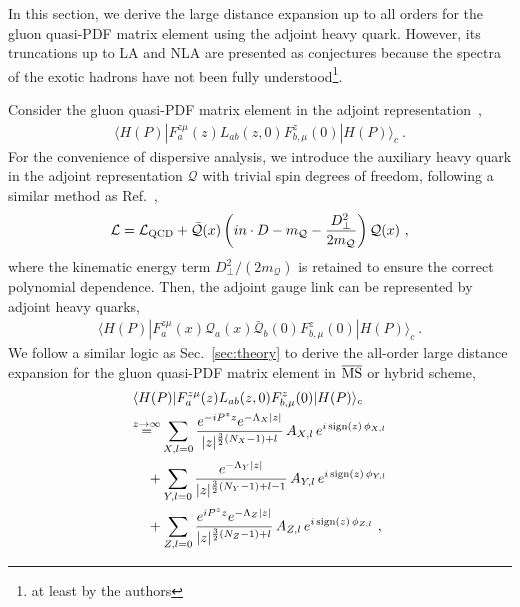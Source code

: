 \documentclass[a4paper,11pt]{article}
\begin{document}
In this section, we derive the large distance expansion up to all orders for the gluon quasi-PDF matrix element using the adjoint heavy quark. However, its truncations up to LA and NLA are presented as conjectures because the spectra of the exotic hadrons have not been fully understood\footnote{at least by the authors}.

Consider the gluon quasi-PDF matrix element in the adjoint representation~\cite{Zhang:2018diq},
\begin{align}
\langle H(P) | F^{z\mu}_{a}(z) L_{ab}(z,0) F^{z}_{b,\mu}(0) | H(P) \rangle_c \ .
\end{align}
For the convenience of dispersive analysis, we introduce the auxiliary heavy quark in the adjoint representation $\mathcal{Q}$ with trivial spin degrees of freedom, following a similar method as Ref.~\cite{Zhang:2018diq},
\begin{align}
\mathcal{L} = \mathcal{L}_{\rm QCD} + \bar{\mathcal{Q}}(x) \left(i n \cdot D - m_{\mathcal{Q}} - \frac{D_{\perp}^2}{2m_{\mathcal{Q}}}\right) \mathcal{Q}(x) \ ,
\end{align}
where the kinematic energy term $D_{\perp}^2/(2m_{\mathcal{Q}})$ is retained to ensure the correct polynomial dependence. Then, the adjoint gauge link can be represented by adjoint heavy quarks, 
\begin{align}
\langle H(P) | F^{z\mu}_{a}(x) \mathcal{Q}_{a}(x) \bar{\mathcal{Q}}_{b}(0) F^{z}_{b,\mu}(0) | H(P) \rangle_c \ .
\end{align}
We follow a similar logic as Sec.~\ref{sec:theory} to derive the all-order large distance expansion for the gluon quasi-PDF matrix element in $\overline{\rm MS}$ or hybrid scheme,
\begin{align}\label{eq:GluonqPDFLzGen}
&\langle H(P) | F^{z\mu}_{a}(z) L_{ab}(z,0) F^{z}_{b,\mu}(0) | H(P) \rangle_c   \nonumber\\
&{\overset{z\rightarrow \infty}{=}}   
 \sum_{X,l=0} \frac{e^{-i P^z z} e^{-\Lambda_X |z| }}{|z|^{\frac{3}{2}(N_X-1)+l}} \, A_{X,l} \, e^{i \, {\rm sign}(z) \, \phi_{X,l}} \nonumber\\
&\quad + \sum_{Y,l=0} \frac{e^{-\Lambda_Y |z|}}{|z|^{\frac{3}{2}(N_Y-1)+l-1}} \, A_{Y,l} \, e^{i \, {\rm sign}(z) \, \phi_{Y,l}} \nonumber\\
&\quad + \sum_{Z,l=0} \frac{e^{i P^z z} e^{-\Lambda_Z |z|}}{|z|^{\frac{3}{2}(N_Z-1)+l}} \, A_{Z,l} \, e^{i \, {\rm sign}(z) \, \phi_{Z,l}} \ ,
\end{align}
\end{document}
